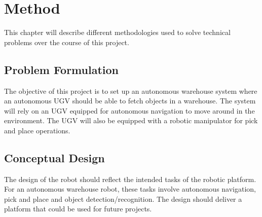 \chapter{Method}




This chapter will describe different methodologies used to solve technical problems over the course of this project.

\section{Problem Formulation}

The objective of this project is to set up an autonomous warehouse system where an autonomous UGV should be able to fetch objects in a warehouse. The system will rely on an UGV equipped for autonomous navigation to move around in the environment. The UGV will also be equipped with a robotic manipulator for pick and place operations.

\section{Conceptual Design}
The design of the robot should reflect the intended tasks of the robotic platform. For an autonomous warehouse robot, these tasks involve autonomous navigation, pick and place and object detection/recognition. The design should deliver a platform that could be used for future projects. 

